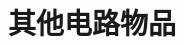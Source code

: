 \section{其他电路物品}
\begin{comment}
\begin{figure}[!htp]
\centering
\subfloat[增速轨道]{\quad\adjincludegraphics{figures/Booster_Track.png}\quad}\qquad
\subfloat[喷泉]{\adjincludegraphics{figures/Pure_Water_Fountain.png}\quad\adjincludegraphics{figures/Desert_Water_Fountain.png}\quad\adjincludegraphics{figures/Jungle_Water_Fountain.png}\quad\adjincludegraphics{figures/Icy_Water_Fountain.png}\quad\adjincludegraphics{figures/Corrupt_Water_Fountain.png}\quad\adjincludegraphics{figures/Crimson_Water_Fountain.png}\quad\adjincludegraphics{figures/Hallowed_Water_Fountain.png}\quad\adjincludegraphics{figures/Blood_Water_Fountain.png}\quad\adjincludegraphics{figures/Cavern_Water_Fountain.png}\quad\adjincludegraphics{figures/Oasis_Water_Fountain.png}}\\
\subfloat[宝石锁]{\adjincludegraphics{figures/Amethyst_Gem_Lock.png}\quad\adjincludegraphics{figures/Topaz_Gem_Lock.png}\quad\adjincludegraphics{figures/Sapphire_Gem_Lock.png}\quad\adjincludegraphics{figures/Emerald_Gem_Lock.png}\quad\adjincludegraphics{figures/Ruby_Gem_Lock.png}\quad\adjincludegraphics{figures/Diamond_Gem_Lock.png}\quad\adjincludegraphics{figures/Amber_Gem_Lock.png}}\qquad
\subfloat[广播盒]{\quad\adjincludegraphics{figures/Announcement_Box.png}\quad}\qquad
\subfloat[烟花盒]{\quad\adjincludegraphics{figures/Fireworks_Box.png}\quad}\\
\subfloat[泡泡机]{\adjincludegraphics{figures/Bubble_Machine.png}}\quad
\subfloat[派对中心]{\quad\adjincludegraphics{figures/Party_Center.png}\quad}
\subfloat[呆萌气球机]{\qquad\adjincludegraphics{figures/Silly_Balloon_Machine.png}\qquad}
\subfloat[天塔柱]{\adjincludegraphics{figures/Vortex_Monolith.png}\quad\adjincludegraphics{figures/Nebula_Monolith.png}\quad\adjincludegraphics{figures/Stardust_Monolith.png}\quad\adjincludegraphics{figures/Solar_Monolith.png}\quad\adjincludegraphics{figures/Void_Monolith.png}\quad\adjincludegraphics{figures/Blood_Moon_Monolith.png}}\\
\subfloat[传送带]{\adjincludegraphics{figures/Conveyor_Belt.png}\quad\adjincludegraphics{figures/Conveyor_Belt_(Counter_Clockwise).png}}\qquad
\subfloat[彩线灯泡]{\qquad\adjincludegraphics{figures/Wire_Bulb.png}\qquad}
\subfloat[制动器]{\qquad\adjincludegraphics{figures/Actuator.png}\qquad}
\subfloat[\Grate]{\qquad\adjincludegraphics{figures/Grate.png}\qquad}

\end{comment}

